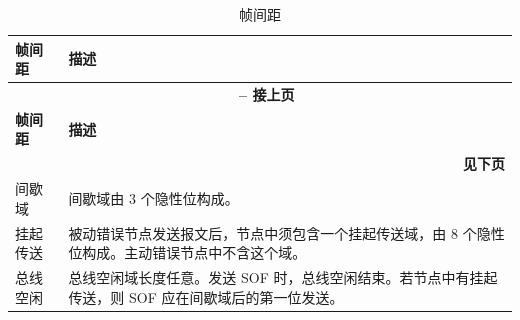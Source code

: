 \begin{longtable}[c]{|p{2.5cm}|p{13cm}|} 
  \caption{帧间距}
  \label{tab:twai-interframe-space} 
  \\\hline
  \rowcolor{lightgray}
  \textbf{帧间距} & \textbf{描述}
  \\\hline
  \endfirsthead
  
  \multicolumn{2}{c}{\bfseries \tablename\ \thetable{} -- 接上页}\\  \hline
  
  \rowcolor{lightgray}
    \textbf{帧间距} & \textbf{描述}
  \\\hline
  \endhead
  
  \multicolumn{2}{r}{\textbf{见下页}} \\
  \endfoot
  \endlastfoot
  
    间歇域 & 间歇域由 3 个隐性位构成。
           \\\hline
    挂起传送 & 被动错误节点发送报文后，节点中须包含一个挂起传送域，由 8 个隐性位构成。主动错误节点中不含这个域。
            \\\hline
    总线空闲 & 总线空闲域长度任意。发送 SOF 时，总线空闲结束。若节点中有挂起传送，则 SOF 应在间歇域后的第一位发送。         
            \\\hline
    
\end{longtable}